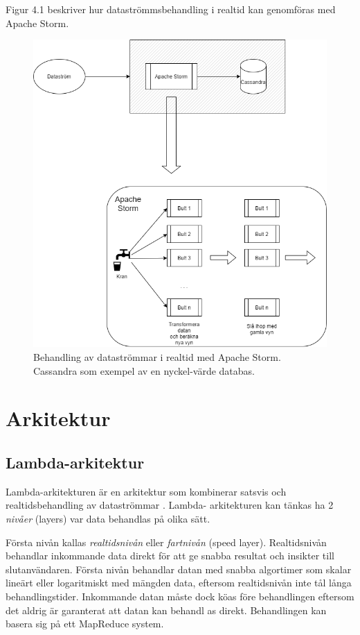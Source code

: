 Figur 4.1 beskriver hur dataströmmsbehandling i realtid kan genomföras
med Apache Storm.


\begin{figure}[h]
    \centering
    \includegraphics[scale=0.7]{img/speed-layer.png}
    \caption{Behandling av dataströmmar i realtid med Apache Storm. Cassandra som exempel av en nyckel-värde databas.}
    \label{fig:mesh1}
\end{figure}


\chapter{Arkitektur}

\section{Lambda-arkitektur}

Lambda-arkitekturen är en arkitektur som kombinerar satsvis och   
realtidsbehandling av dataströmmar \citep{marz2013big}. Lambda-
arkitekturen kan tänkas ha 2 \textit{nivåer} (layers) var data 
behandlas på olika sätt. 

Första nivån kallas \textit{realtidsnivån} 
eller \textit{fartnivån} (speed layer). Realtidsnivån behandlar 
inkommande data direkt för att ge snabba resultat och insikter till 
slutanvändaren. Första nivån behandlar datan med snabba algortimer som
skalar lineärt eller logaritmiskt med mängden data, eftersom realtidsnivån 
inte tål långa behandlingstider. Inkommande datan måste dock köas
före behandlingen eftersom det aldrig är garanterat att datan kan behandl
as direkt. Behandlingen kan basera sig på ett MapReduce system.

